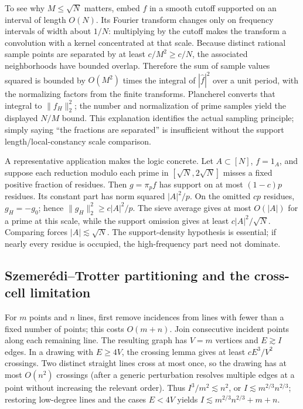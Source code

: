 To see why \(M\le\sqrt N\) matters, embed \(f\) in a smooth cutoff supported on an interval of length \(O(N)\). Its Fourier transform changes only on frequency intervals of width about \(1/N\): multiplying by the cutoff makes the transform a convolution with a kernel concentrated at that scale. Because distinct rational sample points are separated by at least \(c/M^2\ge c/N\), the associated neighborhoods have bounded overlap. Therefore the sum of sample values squared is bounded by \(O(M^2)\) times the integral of \(|\widehat f|^2\) over a unit period, with the normalizing factors from the finite transforms. Plancherel converts that integral to \(\|f_H\|_2^2\); the number and normalization of prime samples yield the displayed \(N/M\) bound. This explanation identifies the actual sampling principle; simply saying ``the fractions are separated'' is insufficient without the support length/local-constancy scale comparison.

A representative application makes the logic concrete. Let \(A\subset[N]\), \(f=1_A\), and suppose each reduction modulo each prime in \([\sqrt N,2\sqrt N]\) misses a fixed positive fraction of residues. Then \(g=\pi_pf\) has support on at most \((1-c)p\) residues. Its constant part has norm squared \(|A|^2/p\). On the omitted \(cp\) residues, \(g_H=-g_0\); hence \(\|g_H\|_2^2\ge c|A|^2/p\). The sieve average gives at most \(O(|A|)\) for a prime at this scale, while the support omission gives at least \(c|A|^2/\sqrt N\). Comparing forces \(|A|\lesssim\sqrt N\). The support-density hypothesis is essential; if nearly every residue is occupied, the high-frequency part need not dominate.

\subsection{Szemerédi--Trotter partitioning and the cross-cell limitation}\label{04-visual-computing-ii-ch033-szemeruxe9ditrotter-partitioning-and-the-cross-cell-limitation}

\hypertarget{04-visual-computing-ii-ch033-szemeréditrotter-partitioning-and-the-cross-cell-limitation}{}

For \(m\) points and \(n\) lines, first remove incidences from lines with fewer than a fixed number of points; this costs \(O(m+n)\). Join consecutive incident points along each remaining line. The resulting graph has \(V=m\) vertices and \(E\gtrsim I\) edges. In a drawing with \(E\ge4V\), the crossing lemma gives at least \(cE^3/V^2\) crossings. Two distinct straight lines cross at most once, so the drawing has at most \(O(n^2)\) crossings (after a generic perturbation resolves multiple edges at a point without increasing the relevant order). Thus \(I^3/m^2\lesssim n^2\), or \(I\lesssim m^{2/3}n^{2/3}\); restoring low-degree lines and the cases \(E<4V\) yields \(I\lesssim m^{2/3}n^{2/3}+m+n\).

